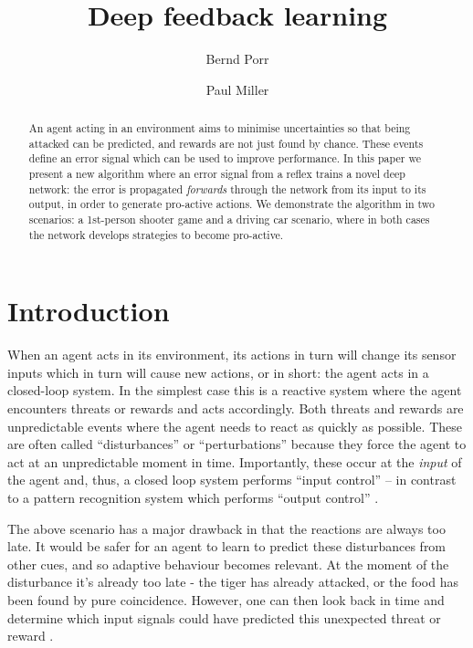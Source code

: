 \documentclass{llncs}
\title{Deep feedback learning}
\author{Bernd Porr \and Paul Miller}
\institute{Glasgow Neuro LTD, United Kingdom\\
  \email{bernd@glasgowneuro.tech}\\
  \email{paul@glasgowneuro.tech}}
\begin{document}
\maketitle

\begin{abstract}
 An agent acting in an environment aims to minimise uncertainties so
 that being attacked can be predicted, and rewards are not just found
 by chance. These events define an error signal which can be used to
 improve performance. In this paper we present a new algorithm where
 an error signal from a reflex trains a novel deep network: the error
 is propagated \textsl{forwards} through the network from its input to
 its output, in order to generate pro-active actions. We demonstrate
 the algorithm in two scenarios: a 1st-person shooter game and a
 driving car scenario, where in both cases the network develops
 strategies to become pro-active.
\end{abstract}

\section{Introduction}
When an agent acts in its environment, its actions in turn will
change its sensor inputs which in turn will cause new actions, or in
short: the agent acts in a closed-loop system. In the simplest case this
is a reactive system where the agent encounters threats or rewards and
acts accordingly. Both threats and rewards are unpredictable events
where the agent needs to react as quickly as possible. These are often 
called ``disturbances'' or ``perturbations'' because they force
the agent to act at an unpredictable moment in time. Importantly, these
occur at the \textsl{input} of the agent and, thus, a closed loop system
performs ``input control'' -- in contrast to a pattern recognition system
which performs ``output control'' \cite{Phillips2000}.

The above scenario has a major drawback in that the reactions are always
too late.  It would be safer for an agent to learn to predict these
disturbances from other cues, and so adaptive behaviour becomes
relevant. At the moment of the disturbance it's already too late - the
tiger has already attacked, or the food has been found by pure
coincidence. However, one can then look back in time and determine
which input signals could have predicted this unexpected
threat or reward \cite{Sutton98,Woergoetter2005,PorrNecoInvco2003}.
\end{document}
